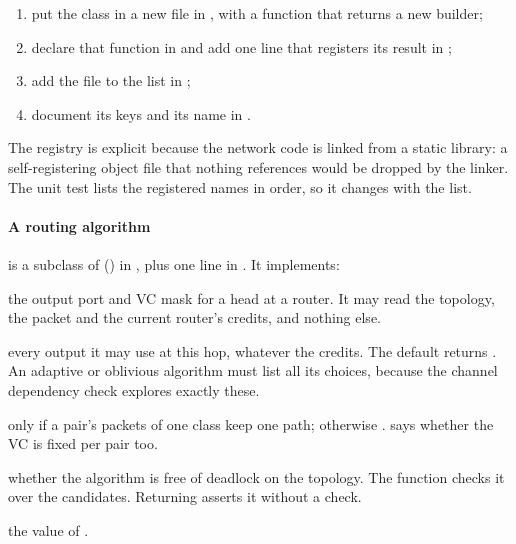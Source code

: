\begin{enumerate}[nosep]
\item put the class in a new file in , with a
  function that returns a new builder;
\item declare that function in  and add one line that registers its result
  in ;
\item add the file to the  list in ;
\item document its keys and its name in .
\end{enumerate}

The registry is explicit because the network code is linked from a static library: a
self-registering object file that nothing references would be dropped by the linker. The unit
test  lists the registered names in order, so it changes with the list.

\paragraph{A routing algorithm} is a subclass of 
() in ,
plus one line in . It implements:

\begin{description}[nosep]
\item[\code{nextHop}] the output port and VC mask for a head at a router. It may read the
  topology, the packet and the current router's credits, and nothing else.
\item[\code{candidates}] every output it may use at this hop, whatever the credits. The default
  returns . An adaptive or oblivious algorithm must list all its choices, because
  the channel dependency check explores exactly these.
\item[\code{ordering}]  only if a pair's packets of one class keep one path;
  otherwise .  says whether the VC is fixed per pair too.
\item[\code{deadlockFreeOn}] whether the algorithm is free of deadlock on the topology. The
  function  checks it over the candidates. Returning 
  asserts it without a check.
\item[\code{name}] the value of .
\end{description}

